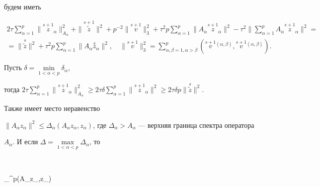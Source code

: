 будем иметь


\begin{multline}


2\tau\sum\limits_{\alpha=1}^p \|\overset {s+1}{z}{}_{\!\!\!\alpha}


\|^2_{A_\alpha}+ 


\|\overset {s+1}{\widetilde z}\|^2 + p^{-2} \|\overset {s+1}{v} \|^2_3 +


\tau^2 p \sum\limits_{\alpha=1}^p \| A_\alpha


\overset{s+1}{z}_{\!\!\!\alpha}\|^2 -


\tau^2\bigg\|\sum\limits_{\alpha=1}^p


A_\alpha\overset{s+1}{z}_{\!\!\!\alpha}\bigg\|^2 = \\


%


=\|\overset {s}{\widetilde z}\|^2 +\tau^2 p \sum\limits_{\alpha=1}^p 


\|A_\alpha\overset {s}{z}{}_\alpha\|^2,


\quad \|\overset {s+1}{v}\|^2_3 =


\sum\limits_{\alpha,\beta=1,\alpha>\beta}^p


(\overset {s+1}{v}{}^{(\alpha,\beta)},


\overset {s+1}{v}{}^{(\alpha,\beta)}).


\end{multline}


Пусть $\delta=\min\limits_{1<\alpha<p}\delta_\alpha$, 


тогда $2\tau\sum\limits_{\alpha=1}^p 


\|\overset {s+1}{z}_{\!\!\!\alpha}\|^2_{A_\alpha}\ge


2\tau\delta\sum\limits_{\alpha=1}^p 


\|\overset {s+1}{z}_{\!\!\!\alpha}\|^2\ge


2\tau\delta p\|\overset {s}{\widetilde z}\|^2$.





Также имеет место неравенство


$\|A_\alpha z_\alpha\|^2\le \Delta_\alpha (A_\alpha z_\alpha,


z_\alpha)$, где $\Delta_\alpha>A_\alpha$ --- верхняя граница спектра оператора


$A_\alpha$. И если $\Delta=\max\limits_{1<\alpha<p}\Delta_\alpha$, то


$$


\sum\limits_{}^p(A_\alpha z_\alpha,z_\alpha)\ge


